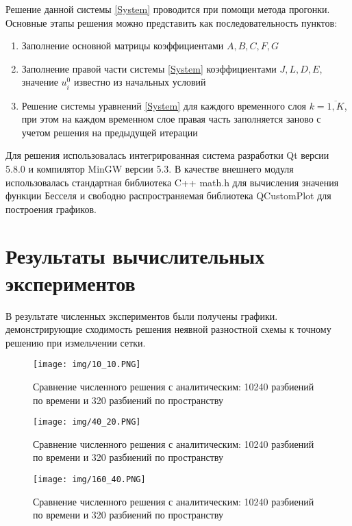 \documentclass[a4paper,12pt,russian, fleqn]{extreport}
\begin{document}
	Решение данной системы \eqref{System} проводится при помощи метода прогонки. Основные этапы решения можно представить как последовательность пунктов:
	\begin{enumerate}
		\item Заполнение основной матрицы коэффициентами $A, B, C, F, G$
		\item Заполнение правой части системы \eqref{System} коэффициентами $J, L, D, E$, значение $u^0_i$ известно из начальных условий
		\item Решение системы уравнений \eqref{System} для каждого временного слоя $k = \overline{1,K}$, при этом на каждом временном слое правая часть заполняется заново с учетом решения на предыдущей итерации
	\end{enumerate}

	Для решения использовалась интегрированная система разработки Qt версии 5.8.0 и компилятор MinGW версии 5.3. В качестве внешнего модуля использовалась стандартная библиотека C++ math.h для вычисления значения функции Бесселя и свободно распространяемая библиотека QCustomPlot для построения графиков.
	
	\newpage
	\section{Результаты вычислительных экспериментов}
	В результате численных экспериментов были получены графики. демонстрирующие сходимость решения неявной разностной схемы к точному решению при измельчении сетки.
	\begin{figure}[h!]
		\begin{center}
		\texttt{[image: img/10\_10.PNG]}
\caption{Сравнение численного решения с аналитическим: 10240 разбиений по времени и 320 разбиений по пространству}
		\end{center}
	\end{figure}

	\begin{figure}[h!]
	\begin{center}
		\texttt{[image: img/40\_20.PNG]}
\caption{Сравнение численного решения с аналитическим: 10240 разбиений по времени и 320 разбиений по пространству}
	\end{center}
	\end{figure}

	\begin{figure}[h!]
	\begin{center}
		\texttt{[image: img/160\_40.PNG]}
\caption{Сравнение численного решения с аналитическим: 10240 разбиений по времени и 320 разбиений по пространству}
	\end{center}
	\end{figure}
\end{document}
